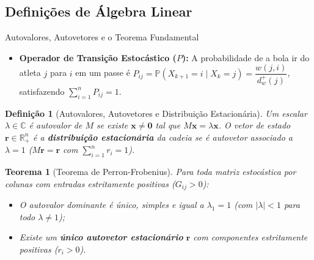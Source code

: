 \documentclass[aspectratio=1610,10pt]{beamer}
\newtheorem{teorema}{Teorema}
\newtheorem{definicao}{Definição}
\begin{document}
\subsection{Definições de Álgebra Linear}
\begin{frame}{Autovalores, Autovetores e o Teorema Fundamental}
  \footnotesize
  \begin{itemize}
    \setlength{\itemsep}{4pt}
    \item \textbf{Operador de Transição Estocástico ($P$):} A probabilidade de a bola ir do atleta $j$ para $i$ em um passe é $P_{ij} = \mathbb{P}(X_{k+1}=i \mid X_k=j) = \dfrac{w(j, i)}{d^{+}_{w}(j)}$, satisfazendo $\sum_{i=1}^{n} P_{ij} = 1$.
  \end{itemize}
  \begin{definicao}[Autovalores, Autovetores e Distribuição Estacionária]
    Um escalar $\lambda \in \mathbb{C}$ é autovalor de $M$ se existe $\mathbf{x} \neq \mathbf{0}$ tal que $M\mathbf{x} = \lambda \mathbf{x}$. O vetor de estado $\mathbf{r} \in \mathbb{R}^n_{+}$ é a \textbf{distribuição estacionária} da cadeia se é autovetor associado a $\lambda = 1$ ($M\mathbf{r} = \mathbf{r}$ com $\sum_{i=1}^n r_i = 1$).
  \end{definicao}
  \begin{teorema}[Teorema de Perron-Frobenius]
    Para toda matriz estocástica por colunas com entradas estritamente positivas ($G_{ij} > 0$):
    \begin{itemize}
      \footnotesize
      \item O autovalor dominante é único, simples e igual a $\lambda_1 = 1$ (com $|\lambda| < 1$ para todo $\lambda \neq 1$);
      \item Existe um \textbf{único autovetor estacionário} $\mathbf{r}$ com componentes estritamente positivas ($r_i > 0$).
    \end{itemize}
  \end{teorema}
\end{frame}

\end{document}

